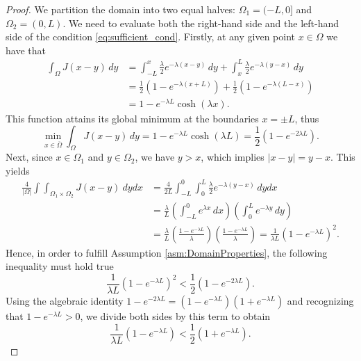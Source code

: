 \documentclass[11pt, a4paper]{article}
\theoremstyle{break}
\theoremstyle{break}
\theoremstyle{break}
\theoremstyle{break}
\theoremstyle{break}
\theoremstyle{break}
\theoremstyle{break}
\theoremstyle{break}
\theoremstyle{break}
\begin{document}
\begin{proof}
    We partition the domain into two equal halves: $\Omega_1 = (-L, 0]$ and $\Omega_2 = (0, L)$. We need to evaluate both the right-hand side and the left-hand side of the condition \eqref{eq:sufficient_cond}. Firstly, at any given point $x \in \Omega$ we have that
    \begin{align*}
        \int_\Omega J(x-y) \, dy &= \int_{-L}^x \frac{\lambda}{2} e^{-\lambda (x-y)} \, dy + \int_x^L \frac{\lambda}{2} e^{-\lambda (y-x)} \, dy \\
        &= \frac{1}{2} \left( 1 - e^{-\lambda(x+L)} \right) + \frac{1}{2} \left( 1 - e^{-\lambda(L-x)} \right) \\
        &= 1 - e^{-\lambda L} \cosh(\lambda x).
    \end{align*}
    This function attains its global minimum at the boundaries $x = \pm L$, thus
    \begin{equation}
        \min_{x \in \overline{\Omega}} \int_\Omega J(x-y) \, dy = 1 - e^{-\lambda L} \cosh(\lambda L) = \frac{1}{2} \left( 1 - e^{-2\lambda L} \right).
    \end{equation}
    Next, since $x \in \Omega_1$ and $y \in \Omega_2$, we have $y > x$, which implies $|x-y| = y-x$. This yields
    \begin{align*}
        \frac{4}{|\Omega|} \int \int_{\Omega_1 \times \Omega_2} J(x-y) \:dydx &= \frac{4}{2L} \int_{-L}^0 \int_0^L \frac{\lambda}{2} e^{-\lambda(y-x)} \, dy dx \\
        &= \frac{\lambda}{L} \left( \int_{-L}^0 e^{\lambda x} \, dx \right) \left( \int_0^L e^{-\lambda y} \, dy \right) \\
        &= \frac{\lambda}{L} \left( \frac{1 - e^{-\lambda L}}{\lambda} \right) \left( \frac{1 - e^{-\lambda L}}{\lambda} \right) = \frac{1}{\lambda L} \left( 1 - e^{-\lambda L} \right)^2.
    \end{align*}
    Hence, in order to fulfill Assumption \ref{asm:DomainProperties}, the following inequality must hold true
    \begin{equation}
        \frac{1}{\lambda L} \left( 1 - e^{-\lambda L} \right)^2 < \frac{1}{2} \left( 1 - e^{-2\lambda L} \right).
    \end{equation}
    Using the algebraic identity $1 - e^{-2\lambda L} = (1 - e^{-\lambda L})(1 + e^{-\lambda L})$ and recognizing that $1 - e^{-\lambda L} > 0$, we divide both sides by this term to obtain
    \begin{equation}
        \frac{1}{\lambda L} \left( 1 - e^{-\lambda L} \right) < \frac{1}{2} \left( 1 + e^{-\lambda L} \right).

\end{equation}
\end{proof}
\end{document}
